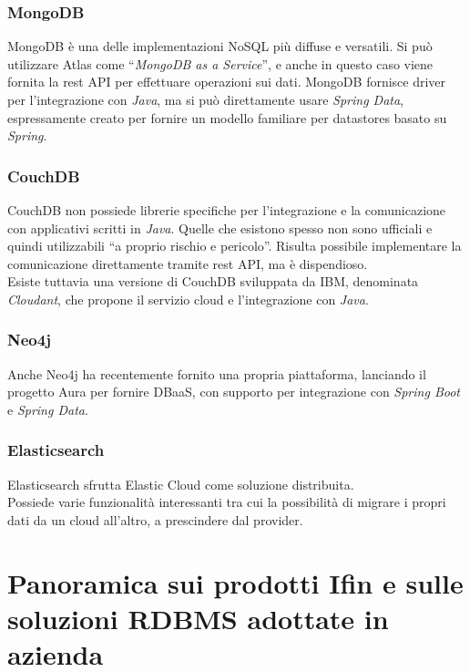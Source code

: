 \subsubsection{MongoDB}
MongoDB è una delle implementazioni NoSQL più diffuse e versatili. Si può utilizzare Atlas come ``\textit{MongoDB as a Service}'', e anche in questo caso viene fornita la \gls{rest API} per effettuare operazioni sui dati. MongoDB fornisce driver per l'integrazione con \textit{Java}, ma si può direttamente usare \textit{Spring Data}, espressamente creato per fornire un modello familiare per datastores basato su \textit{Spring}\cite{site:udemymongodb}.

\subsubsection{CouchDB}
CouchDB non possiede librerie specifiche per l'integrazione e la comunicazione con applicativi scritti in \textit{Java}. Quelle che esistono spesso non sono ufficiali e quindi utilizzabili ``a proprio rischio e pericolo''. Risulta possibile implementare la comunicazione direttamente tramite \gls{rest API}, ma è dispendioso.\\
Esiste tuttavia una versione di CouchDB sviluppata da IBM, denominata \textit{Cloudant}, che propone il servizio cloud e l'integrazione con \textit{Java}\cite{site:udemycouchdb}.

\subsubsection{Neo4j}
Anche Neo4j ha recentemente fornito una propria piattaforma, lanciando il progetto Aura per fornire \gls{DBaaS}, con supporto per integrazione con \textit{Spring Boot} e \textit{Spring Data}\cite{site:udemyneo4j}.

\subsubsection{Elasticsearch}
Elasticsearch sfrutta Elastic Cloud come soluzione distribuita.\\
Possiede varie funzionalità interessanti tra cui la possibilità di migrare i propri dati da un cloud all'altro, a prescindere dal provider\cite{site:udemyelasticsearch}.


\section{Panoramica sui prodotti Ifin e sulle soluzioni RDBMS adottate in azienda}

